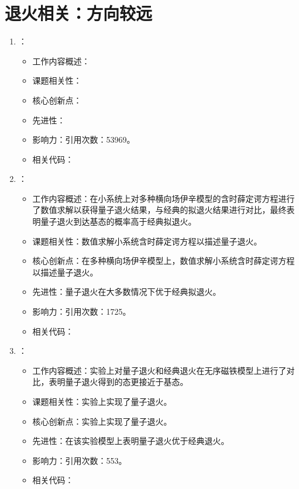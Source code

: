 \section{退火相关：方向较远}
\begin{enumerate}
    \item \citet{kirkpatrick1983optimization}：
        \begin{itemize}
            \item 工作内容概述：
            \item 课题相关性：
            \item 核心创新点：
            \item 先进性：
            \item 影响力：引用次数：53969。
            \item 相关代码：
        \end{itemize}
        \item \citet{kadowaki1998quantum}：
            \begin{itemize}
                \item 工作内容概述：在小系统上对多种横向场伊辛模型的含时薛定谔方程进行了数值求解以获得量子退火结果，与经典的拟退火结果进行对比，最终表明量子退火到达基态的概率高于经典拟退火。
                \item 课题相关性：数值求解小系统含时薛定谔方程以描述量子退火。
                \item 核心创新点：在多种横向场伊辛模型上，数值求解小系统含时薛定谔方程以描述量子退火。
                \item 先进性：量子退火在大多数情况下优于经典拟退火。
                \item 影响力：引用次数：1725。
                \item 相关代码：
            \end{itemize}
        \item \citet{brooke1999quantum}：
            \begin{itemize}
                \item 工作内容概述：实验上对量子退火和经典退火在无序磁铁模型上进行了对比，表明量子退火得到的态更接近于基态。
                \item 课题相关性：实验上实现了量子退火。
                \item 核心创新点：实验上实现了量子退火。
                \item 先进性：在该实验模型上表明量子退火优于经典退火。
                \item 影响力：引用次数：553。
                \item 相关代码：

\end{itemize}
\end{enumerate}
